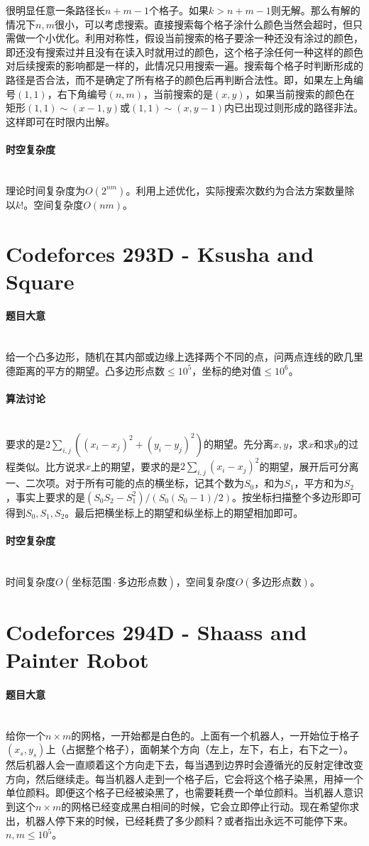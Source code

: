 \documentclass[UTF8]{ctexart}
\newcommand{\myparagraph}[1]{\paragraph{#1}\mbox{}\\}
\theoremstyle{nonumberplain}
\begin{document}
			很明显任意一条路径长$n+m-1$个格子。如果$k>n+m-1$则无解。那么有解的情况下$n,m$很小，可以考虑搜索。直接搜索每个格子涂什么颜色当然会超时，但只需做一个小优化。利用对称性，假设当前搜索的格子要涂一种还没有涂过的颜色，即还没有搜索过并且没有在读入时就用过的颜色，这个格子涂任何一种这样的颜色对后续搜索的影响都是一样的，此情况只用搜索一遍。搜索每个格子时判断形成的路径是否合法，而不是确定了所有格子的颜色后再判断合法性。即，如果左上角编号$(1,1)$，右下角编号$(n,m)$，当前搜索的是$(x,y)$，如果当前搜索的颜色在矩形$(1,1)\sim(x-1,y)$或$(1,1)\sim(x,y-1)$内已出现过则形成的路径非法。这样即可在时限内出解。
		
		\myparagraph{时空复杂度}
		
			理论时间复杂度为$O(2^{nm})$。利用上述优化，实际搜索次数约为合法方案数量除以$k!$。空间复杂度$O(nm)$。
	
	\section{Codeforces 293D - Ksusha and Square}
	
		\myparagraph{题目大意}
		
			给一个凸多边形，随机在其内部或边缘上选择两个不同的点，问两点连线的欧几里德距离的平方的期望。凸多边形点数$\leq 10^5$，坐标的绝对值$\leq 10^6$。
			
		\myparagraph{算法讨论}
		
			要求的是$2\sum_{i,j}((x_i-x_j)^2+(y_i-y_j)^2)$的期望。先分离$x,y$，求$x$和求$y$的过程类似。比方说求$x$上的期望，要求的是$2\sum_{i,j}(x_i-x_j)^2$的期望，展开后可分离一、二次项。对于所有可能的点的横坐标，记其个数为$S_0$，和为$S_1$，平方和为$S_2$，事实上要求的是$(S_0S_2-S_1^2)/(S_0(S_0-1)/2)$。按坐标扫描整个多边形即可得到$S_0,S_1,S_2$。最后把横坐标上的期望和纵坐标上的期望相加即可。
			
		\myparagraph{时空复杂度}
		
			时间复杂度$O(\mbox{坐标范围}\cdot\mbox{多边形点数})$，空间复杂度$O(\mbox{多边形点数})$。
	
	\section{Codeforces 294D - Shaass and Painter Robot}
	
		\myparagraph{题目大意}
		
			给你一个$n \times m$的网格，一开始都是白色的。上面有一个机器人，一开始位于格子$(x_s,y_s)$上（占据整个格子），面朝某个方向（左上，左下，右上，右下之一）。然后机器人会一直顺着这个方向走下去，每当遇到边界时会遵循光的反射定律改变方向，然后继续走。每当机器人走到一个格子后，它会将这个格子染黑，用掉一个单位颜料。即便这个格子已经被染黑了，也需要耗费一个单位颜料。当机器人意识到这个$n \times m$的网格已经变成黑白相间的时候，它会立即停止行动。现在希望你求出，机器人停下来的时候，已经耗费了多少颜料？或者指出永远不可能停下来。$n,m \leq 10^5$。
			
\end{document}
